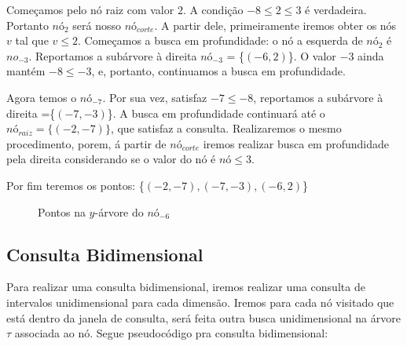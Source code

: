Começamos pelo nó raiz com valor $2$. A condição $-8 \leq 2 \leq 3$ é verdadeira. Portanto $nó_{2}$
será nosso $nó_{corte}$.
A partir dele, primeiramente iremos obter os nós $v$ tal que $v \leq 2$. Começamos a busca em profundidade:
o nó a esquerda de $nó_{2}$ é $no_{-3}$. Reportamos a subárvore à direita $nó_{-3}$ = \{$(-6,2)$\}.
O valor $-3$ ainda mantém $-8 \leq -3$, e, portanto, continuamos a busca em profundidade.

Agora temos o $nó_{-7}$. Por sua vez, satisfaz  $-7 \leq -8$, reportamos a subárvore à direita =\{$(-7, -3)$\}.
A busca em profundidade continuará até o $nó_{raiz}=\{(-2,-7)\}$, que satisfaz a consulta.
Realizaremos o mesmo procedimento, porem, á partir de $nó_{corte}$ iremos realizar busca em profundidade pela direita considerando se o valor do nó é $nó \leq 3$.

Por fim teremos os pontos: \{$(-2,-7), (-7,-3), (-6,2)$\}
\begin{figure}[h]
\centering
{}
\caption{Pontos na $y$-árvore do $nó_{-6}$}
\end{figure}

\subsection{Consulta Bidimensional}

Para realizar uma consulta bidimensional, iremos realizar uma consulta de intervalos unidimensional para
cada dimensão. 
Iremos para cada nó visitado que está dentro da janela de consulta, será feita outra busca unidimensional
na árvore $\tau$ associada ao nó.
Segue pseudocódigo pra consulta bidimensional:

